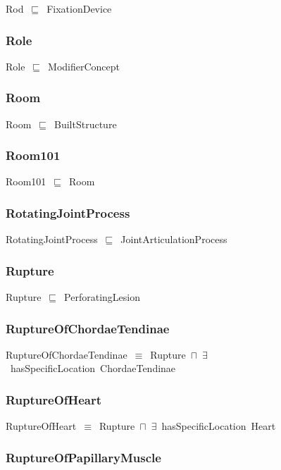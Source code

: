 \documentclass{article}
\begin{document}
Rod~\ensuremath{\sqsubseteq}~FixationDevice~

\subsubsection*{Role}

Role~\ensuremath{\sqsubseteq}~ModifierConcept~

\subsubsection*{Room}

Room~\ensuremath{\sqsubseteq}~BuiltStructure~

\subsubsection*{Room101}

Room101~\ensuremath{\sqsubseteq}~Room~

\subsubsection*{RotatingJointProcess}

RotatingJointProcess~\ensuremath{\sqsubseteq}~JointArticulationProcess~

\subsubsection*{Rupture}

Rupture~\ensuremath{\sqsubseteq}~PerforatingLesion~

\subsubsection*{RuptureOfChordaeTendinae}

RuptureOfChordaeTendinae~\ensuremath{\equiv}~Rupture~\ensuremath{\sqcap}~\ensuremath{\exists}~hasSpecificLocation~ChordaeTendinae

\subsubsection*{RuptureOfHeart}

RuptureOfHeart~\ensuremath{\equiv}~Rupture~\ensuremath{\sqcap}~\ensuremath{\exists}~hasSpecificLocation~Heart

\subsubsection*{RuptureOfPapillaryMuscle}
\end{document}
